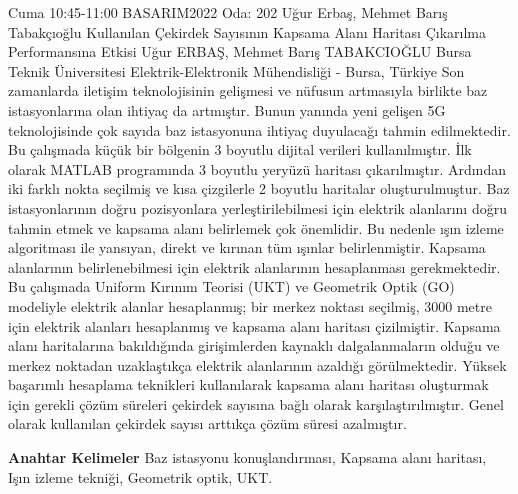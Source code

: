 
    \begin{abstract_basarim}
    {Cuma 10:45-11:00}
    {BASARIM2022}
    {Oda: 202}
    {Uğur Erbaş, Mehmet Barış Tabakçıoğlu}
    {Kullanılan Çekirdek Sayısının Kapsama Alanı Haritası Çıkarılma Performansına Etkisi}
    {%
    Uğur ERBAŞ, Mehmet Barış TABAKCIOĞLU}
    {%
    }
    {%
    Bursa Teknik Üniversitesi Elektrik-Elektronik Mühendisliği - Bursa, Türkiye}
    Son zamanlarda iletişim teknolojisinin gelişmesi ve nüfusun artmasıyla birlikte baz istasyonlarına olan ihtiyaç da artmıştır. Bunun yanında yeni gelişen 5G teknolojisinde çok sayıda baz istasyonuna ihtiyaç duyulacağı tahmin edilmektedir. Bu çalışmada küçük bir bölgenin 3 boyutlu dijital verileri kullanılmıştır. İlk olarak MATLAB programında 3 boyutlu yeryüzü haritası çıkarılmıştır. Ardından iki farklı nokta seçilmiş ve kısa çizgilerle 2 boyutlu haritalar oluşturulmuştur. Baz istasyonlarının doğru pozisyonlara yerleştirilebilmesi için elektrik alanlarını doğru tahmin etmek ve kapsama alanı belirlemek çok önemlidir. Bu nedenle ışın izleme algoritması ile yansıyan, direkt ve kırınan tüm ışınlar belirlenmiştir. Kapsama alanlarının belirlenebilmesi için elektrik alanlarının hesaplanması gerekmektedir. Bu çalışmada Uniform Kırınım Teorisi (UKT) ve Geometrik Optik (GO) modeliyle elektrik alanlar hesaplanmış; bir merkez noktası seçilmiş, 3000 metre için elektrik alanları hesaplanmış ve kapsama alanı haritası çizilmiştir. Kapsama alanı haritalarına bakıldığında girişimlerden kaynaklı dalgalanmaların olduğu ve merkez noktadan uzaklaştıkça elektrik alanlarının azaldığı görülmektedir. Yüksek başarımlı hesaplama teknikleri kullanılarak kapsama alanı haritası oluşturmak için gerekli çözüm süreleri çekirdek sayısına bağlı olarak karşılaştırılmıştır. Genel olarak kullanılan çekirdek sayısı arttıkça çözüm süresi azalmıştır. 
    
            \textbf{Anahtar Kelimeler} \newline{}Baz istasyonu konuşlandırması, Kapsama alanı haritası, Işın izleme tekniği, Geometrik optik, UKT.
    \end{abstract_basarim}
    
